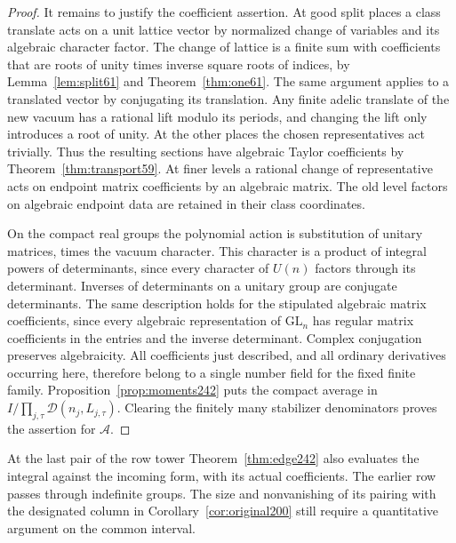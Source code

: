 \documentclass[a4paper,11pt]{article}
\theoremstyle{definition}
\theoremstyle{remark}
\numberwithin{equation}{section}
\begin{document}
\begin{proof}
It remains to justify the coefficient assertion. At good split
places a class translate acts on a unit lattice vector by normalized
change of variables and its algebraic character factor. The change
of lattice is a finite sum with coefficients that are roots of
unity times inverse square roots of indices, by
Lemma~\ref{lem:split61} and Theorem~\ref{thm:one61}. The same
argument applies to a translated vector by conjugating its
translation. Any finite adelic translate of the new vacuum has
a rational lift modulo its periods, and changing the lift only
introduces a root of unity. At the other places the chosen
representatives act trivially. Thus the resulting sections
have algebraic Taylor coefficients by Theorem~\ref{thm:transport59}.
At finer levels a rational change of representative acts on
endpoint matrix coefficients by an algebraic matrix. The
old level factors on algebraic endpoint data are retained in
their class coordinates.

On the compact real groups the polynomial action is substitution
of unitary matrices, times the vacuum character. This character
is a product of integral powers of determinants, since every
character of \(U(n)\) factors through its determinant. Inverses
of determinants on a unitary group are conjugate determinants.
The same description holds for the stipulated algebraic matrix
coefficients, since every algebraic representation of
\(\mathrm{GL}_n\) has regular matrix coefficients in the entries
and the inverse determinant. Complex conjugation preserves
algebraicity. All coefficients just described, and all ordinary
derivatives occurring here, therefore belong to a single number
field for the fixed finite family. Proposition~\ref{prop:moments242}
puts the compact average in \(I/\prod_{j,\tau}\mathcal
D(n_j,L_{j,\tau})\). Clearing the finitely many stabilizer
denominators proves the assertion for \(\mathcal A\).
\end{proof}

At the last pair of the row tower Theorem~\ref{thm:edge242}
also evaluates the integral against the incoming form, with its
actual coefficients. The earlier row passes through indefinite
groups. The size and nonvanishing of its pairing with the
designated column in Corollary~\ref{cor:original200} still
require a quantitative argument on the common interval.
\end{document}
